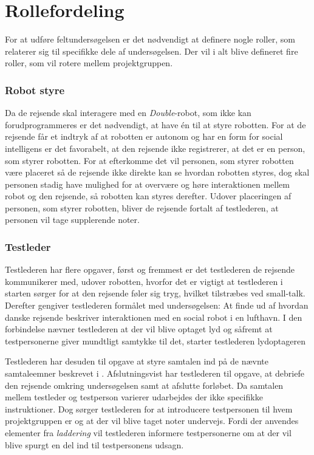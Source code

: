 \section{Rollefordeling}
\label{ParametreRollefordeling}
%
For at udføre feltundersøgelsen er det nødvendigt at definere nogle roller, som relaterer sig til specifikke dele af undersøgelsen. Der vil i alt blive defineret fire roller, som vil rotere mellem projektgruppen.
%
\subsubsection*{Robot styre}
Da de rejsende skal interagere med en \textit{Double}-robot, som ikke kan forudprogrammeres er det nødvendigt, at have én til at styre robotten. For at de rejsende får et indtryk af at robotten er autonom og har en form for social intelligens er det favorabelt, at den rejsende ikke registrerer, at det er en person, som styrer robotten. For at efterkomme det vil personen, som styrer robotten være placeret så de rejsende ikke direkte kan se hvordan robotten styres, dog skal personen stadig have mulighed for at overvære og høre interaktionen mellem robot og den rejsende, så robotten kan styres derefter. Udover placeringen af personen, som styrer robotten, bliver de rejsende fortalt af testlederen, at personen vil tage supplerende noter. 

\subsubsection*{Testleder}
Testlederen har flere opgaver, først og fremmest er det testlederen de rejsende kommunikerer med, udover robotten, hvorfor det er vigtigt at testlederen i starten sørger for at den rejsende føler sig tryg, hvilket tilstræbes ved small-talk. Derefter gengiver testlederen formålet med undersøgelsen: At finde ud af hvordan danske rejsende beskriver interaktionen med en social robot i en lufthavn. I den forbindelse nævner testlederen at der vil blive optaget lyd og såfremt at testpersonerne giver mundtligt samtykke til det, starter testlederen lydoptageren

Testlederen har desuden til opgave at styre samtalen ind på de nævnte samtaleemner beskrevet i . Afslutningsvist har testlederen til opgave, at debriefe den rejsende omkring undersøgelsen samt at afslutte forløbet. Da samtalen mellem testleder og testperson varierer udarbejdes der ikke specifikke instruktioner. Dog sørger testlederen for at introducere testpersonen til hvem projektgruppen er og at der vil blive taget noter undervejs. Fordi der anvendes elementer fra \textit{laddering} vil testlederen informere testpersonerne om at der vil blive spurgt en del ind til testpersonens udsagn.

